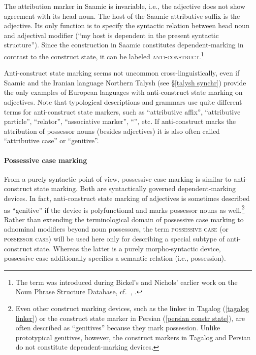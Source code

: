 The attribution marker in Saamic is invariable, i.e., the adjective does not show agreement with its head noun. The host of the Saamic attributive suffix is the adjective. Its only function is to specify the syntactic relation between head noun and adjectival modifier (“my host is dependent in the present syntactic structure”). Since the construction in Saamic constitutes dependent\hyp{}marking in contrast to the  construct state, it can be labeled \textsc{anti\hyp{}construct}.\footnote{The term was introduced during Bickel's and Nichols' earlier work on the  Noun Phrase Structure Database, cf.~\citet[2, passim]{bickel-etal2002}, \citet{AUTOTYP-NP}.} 

\largerpage[-2]
Anti\hyp{}construct state marking seems not uncommon cross-linguistically, even if Saamic and the Iranian language Northern Talysh (see \S\ref{talysh synchr}) provide the only examples of European languages with anti\hyp{}construct state marking on adjectives. Note that typological descriptions and grammars use quite different terms for anti\hyp{}construct state markers, such as “attributive affix”, “attributive particle”, “relator”, “associative marker”, “”, etc. If anti\hyp{}construct marks the attribution of possessor nouns (besides adjectives) it is also often called “attributive case” or “genitive”.

\paragraph*{Possessive case marking} 
From a purely syntactic point of view, possessive case marking is similar to anti\hyp{}construct state marking. Both are syntactically governed dependent\hyp{}marking devices. In fact, anti\hyp{}construct state marking of adjectives is sometimes described as “genitive” if the device is polyfunctional and marks possessor nouns as well.\footnote{Even other construct marking devices, such as the linker in Tagalog (\ref{tagalog linker}) or the construct state marker in Persian (\ref{persian constr state}), are often described as “genitives” because they mark possession. Unlike prototypical genitives, however, the construct markers in Tagalog and Persian do not constitute dependent\hyp{}marking devices.} Rather than extending the terminological domain of possessive case marking to adnominal modifiers beyond noun possessors, the term \textsc{possessive case} (or \textsc{possessor case}) will be used here only for describing a special subtype of anti\hyp{}construct state. Whereas the latter is a purely morpho-syntactic device, possessive case additionally specifies a semantic relation (i.e., possession).

